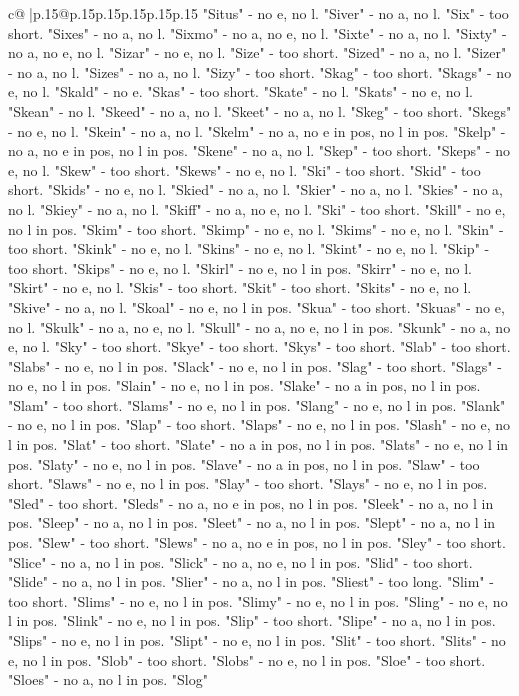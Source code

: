 \documentclass{article}
\begin{document}
{\begin{supertabular}{c@{$\;$}|p{.15\linewidth}@{}p{.15\linewidth}p{.15\linewidth}p{.15\linewidth}p{.15\linewidth}p{.15\linewidth}}
{{{"Situs" {-} no e, no l. "Siver" {-} no a, no l. "Six" {-} too short. "Sixes" {-} no a, no l. "Sixmo" {-} no a, no e, no l. "Sixte" {-} no a, no l. "Sixty" {-} no a, no e, no l. "Sizar" {-} no e, no l. "Size" {-} too short. "Sized" {-} no a, no l. "Sizer" {-} no a, no l. "Sizes" {-} no a, no l. "Sizy" {-} too short. "Skag" {-} too short. "Skags" {-} no e, no l. "Skald" {-} no e. "Skas" {-} too short. "Skate" {-} no l. "Skats" {-} no e, no l. "Skean" {-} no l. "Skeed" {-} no a, no l. "Skeet" {-} no a, no l. "Skeg" {-} too short. "Skegs" {-} no e, no l. "Skein" {-} no a, no l. "Skelm" {-} no a, no e in pos, no l in pos. "Skelp" {-} no a, no e in pos, no l in pos. "Skene" {-} no a, no l. "Skep" {-} too short. "Skeps" {-} no e, no l. "Skew" {-} too short. "Skews" {-} no e, no l. "Ski" {-} too short. "Skid" {-} too short. "Skids" {-} no e, no l. "Skied" {-} no a, no l. "Skier" {-} no a, no l. "Skies" {-} no a, no l. "Skiey" {-} no a, no l. "Skiff" {-} no a, no e, no l. "Ski" {-} too short. "Skill" {-} no e, no l in pos. "Skim" {-} too short. "Skimp" {-} no e, no l. "Skims" {-} no e, no l. "Skin" {-} too short. "Skink" {-} no e, no l. "Skins" {-} no e, no l. "Skint" {-} no e, no l. "Skip" {-} too short. "Skips" {-} no e, no l. "Skirl" {-} no e, no l in pos. "Skirr" {-} no e, no l. "Skirt" {-} no e, no l. "Skis" {-} too short. "Skit" {-} too short. "Skits" {-} no e, no l. "Skive" {-} no a, no l. "Skoal" {-} no e, no l in pos. "Skua" {-} too short. "Skuas" {-} no e, no l. "Skulk" {-} no a, no e, no l. "Skull" {-} no a, no e, no l in pos. "Skunk" {-} no a, no e, no l. "Sky" {-} too short. "Skye" {-} too short. "Skys" {-} too short. "Slab" {-} too short. "Slabs" {-} no e, no l in pos. "Slack" {-} no e, no l in pos. "Slag" {-} too short. "Slags" {-} no e, no l in pos. "Slain" {-} no e, no l in pos. "Slake" {-} no a in pos, no l in pos. "Slam" {-} too short. "Slams" {-} no e, no l in pos. "Slang" {-} no e, no l in pos. "Slank" {-} no e, no l in pos. "Slap" {-} too short. "Slaps" {-} no e, no l in pos. "Slash" {-} no e, no l in pos. "Slat" {-} too short. "Slate" {-} no a in pos, no l in pos. "Slats" {-} no e, no l in pos. "Slaty" {-} no e, no l in pos. "Slave" {-} no a in pos, no l in pos. "Slaw" {-} too short. "Slaws" {-} no e, no l in pos. "Slay" {-} too short. "Slays" {-} no e, no l in pos. "Sled" {-} too short. "Sleds" {-} no a, no e in pos, no l in pos. "Sleek" {-} no a, no l in pos. "Sleep" {-} no a, no l in pos. "Sleet" {-} no a, no l in pos. "Slept" {-} no a, no l in pos. "Slew" {-} too short. "Slews" {-} no a, no e in pos, no l in pos. "Sley" {-} too short. "Slice" {-} no a, no l in pos. "Slick" {-} no a, no e, no l in pos. "Slid" {-} too short. "Slide" {-} no a, no l in pos. "Slier" {-} no a, no l in pos. "Sliest" {-} too long. "Slim" {-} too short. "Slims" {-} no e, no l in pos. "Slimy" {-} no e, no l in pos. "Sling" {-} no e, no l in pos. "Slink" {-} no e, no l in pos. "Slip" {-} too short. "Slipe" {-} no a, no l in pos. "Slips" {-} no e, no l in pos. "Slipt" {-} no e, no l in pos. "Slit" {-} too short. "Slits" {-} no e, no l in pos. "Slob" {-} too short. "Slobs" {-} no e, no l in pos. "Sloe" {-} too short. "Sloes" {-} no a, no l in pos. "Slog" }}}
\end{supertabular}}
\end{document}

